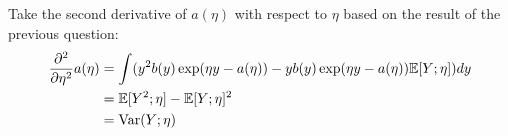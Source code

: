 \begin{answer}
    Take the second derivative of $a(\eta)$ with respect to $\eta$ based on 
    the result of the previous question:
    \begin{align*}
        \frac{\partial^2}{\partial \eta^2} a(\eta) &= \int (y^2 b(y) \exp(\eta y - a(\eta)) - y b(y) \exp(\eta y - a(\eta)) \mathbb{E}[Y; \eta]) dy \\
        &= \mathbb{E}[Y^2; \eta] - \mathbb{E}[Y; \eta]^2 \\
        &= \operatorname{Var}(Y; \eta)
    \end{align*}
\end{answer}
